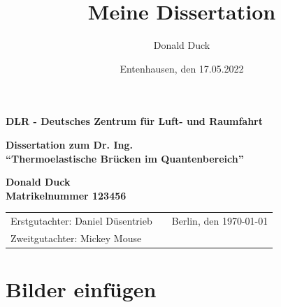 \documentclass[12pt,ngerman,parskip=half]{scrreprt}
\author{Donald Duck}
\title{Meine Dissertation}
\date{Entenhausen, den 17.05.2022}
\begin{document}
\begin{titlepage}

{\Large\bfseries DLR - Deutsches Zentrum für Luft- und Raumfahrt} \vspace*{1cm}


\vspace*{2cm}

\begin{center}
\huge\bfseries Dissertation zum Dr. Ing.  \\ 
\enquote{Thermoelastische Brücken im Quantenbereich}
\end{center}

\vspace*{2cm}

\begin{center}
\large\bfseries Donald Duck \\ 
Matrikelnummer 123456
\end{center}

\vfill

\begin{tabular}{lp{}r}
Erstgutachter: Daniel Düsentrieb & &Berlin, den \today \\ 
Zweitgutachter: Mickey Mouse \\
\end{tabular}

\end{titlepage}


\tableofcontents

\listoffigures

\listoftables

\chapter{Bilder einfügen}

\blindtext

\blindtext
\end{document}
